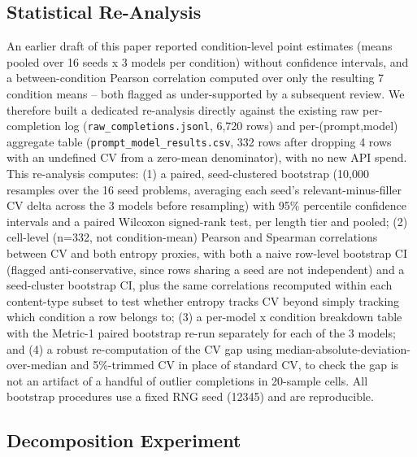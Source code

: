 \documentclass[11pt,letterpaper]{article}
\begin{document}
\subsection{Statistical Re-Analysis}
\label{sec:stat-reanalysis}

An earlier draft of this paper reported condition-level point estimates (means pooled over 16 seeds x 3 models per condition) without confidence intervals, and a between-condition Pearson correlation computed over only the resulting 7 condition means -- both flagged as under-supported by a subsequent review. We therefore built a dedicated re-analysis directly against the existing raw per-completion log (\texttt{raw\_completions.jsonl}, 6,720 rows) and per-(prompt,model) aggregate table (\texttt{prompt\_model\_results.csv}, 332 rows after dropping 4 rows with an undefined CV from a zero-mean denominator), with no new API spend. This re-analysis computes: (1) a paired, seed-clustered bootstrap (10,000 resamples over the 16 seed problems, averaging each seed's relevant-minus-filler CV delta across the 3 models before resampling) with 95\% percentile confidence intervals and a paired Wilcoxon signed-rank test, per length tier and pooled; (2) cell-level (n=332, not condition-mean) Pearson and Spearman correlations between CV and both entropy proxies, with both a naive row-level bootstrap CI (flagged anti-conservative, since rows sharing a seed are not independent) and a seed-cluster bootstrap CI, plus the same correlations recomputed within each content-type subset to test whether entropy tracks CV beyond simply tracking which condition a row belongs to; (3) a per-model x condition breakdown table with the Metric-1 paired bootstrap re-run separately for each of the 3 models; and (4) a robust re-computation of the CV gap using median-absolute-deviation-over-median and 5\%-trimmed CV in place of standard CV, to check the gap is not an artifact of a handful of outlier completions in 20-sample cells. All bootstrap procedures use a fixed RNG seed (12345) and are reproducible.

\subsection{Decomposition Experiment}
\label{sec:decomp-method}
\end{document}
